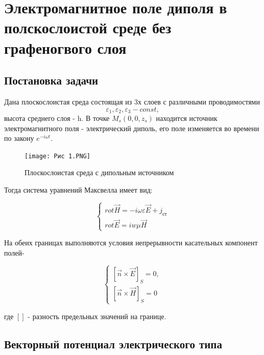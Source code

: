 	\newpage 
	\section {Электромагнитное поле диполя в полскослоистой среде без графеногвого слоя}
	
	\subsection{Постановка задачи}
	
	Дана плоскослоистая среда состоящая из 3х слоев с различными проводимостями $$\varepsilon_1, \varepsilon_2, \varepsilon_3 - const, $$ высота среднего слоя - h. 
	В точке $M_s(0,0,z_s) $ находится источник электромагнитного поля - электрический диполь, его поле изменяется во времени по закону $e^{-i\omega t}$.
	
	\begin{figure}[h] %
		\centering %
		\texttt{[image: Рис 1.PNG]} %
		\caption{Плоскослоистая среда с дипольным источником} %
		\label{fig:example} %
	\end{figure}
	
	Тогда система уравнений Максвелла имеет вид:
	
	
	\begin{equation}
		\begin{cases} rot \vec{H} = -i \omega \varepsilon \vec{E} + j_{ст} \\ rot \vec{E} = iw\mu \vec{H} \end{cases}
	\end{equation}
	
	На обеих границах выполняются условия непрерывности касательных компонент полей-
	
	\begin{equation}
		\begin{cases} [\vec{n} \times \vec{E} ]_S = 0, \\ [\vec{n} \times \vec{H}]_S = 0 \end{cases}
	\end{equation}
	
	где $[]$ - разность предельных значений на границе. 
	
	\newpage
	\subsection{Векторный потенциал электрического типа}
	
